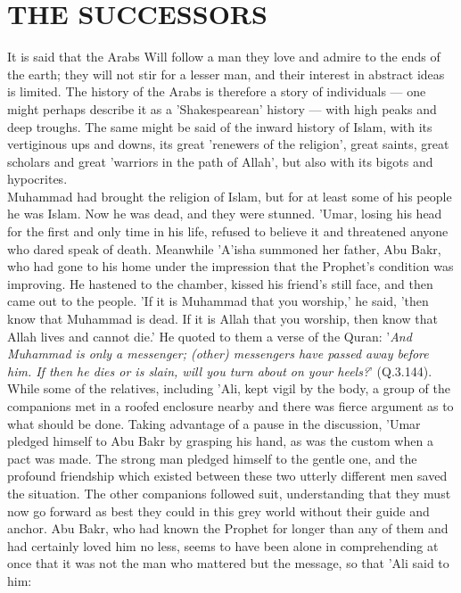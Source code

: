 \documentclass[10pt, twoside,openright]{book}
\begin{document}
\chapter{THE SUCCESSORS}

It is said that the Arabs Will follow a man they love and admire to the ends of the earth; they will not stir for a lesser man, and their interest in abstract ideas is limited. The history of the Arabs is therefore a story of individuals --- one might perhaps describe it as a 'Shakespearean' history --- with high peaks and deep troughs. The same might be said of the inward history of Islam, with its vertiginous ups and downs, its great 'renewers of the religion', great saints, great scholars and great 'warriors in the path of Allah', but also with its bigots and hypocrites. \\

Muhammad had brought the religion of Islam, but for at least some of his people he was Islam. Now he was dead, and they were stunned. 'Umar, losing his head for the first and only time in his life, refused to believe it and threatened anyone who dared speak of death. Meanwhile 'A'isha summoned her father, Abu Bakr, who had gone to his home under the impression that the Prophet's condition was improving. He hastened to the chamber, kissed his friend's still face, and then came out to the people. 'If it is Muhammad that you worship,' he said, 'then know that Muhammad is dead. If it is Allah that you worship, then know that Allah lives and cannot die.' He quoted to them a verse of the Quran: '\emph{And Muhammad is only a messenger; (other) messengers have passed away before him. If then he dies or is slain, will you turn about on your heels?}' (Q.3.144). \\

While some of the relatives, including 'Ali, kept vigil by the body, a group of the companions met in a roofed enclosure nearby and there was fierce argument as to what should be done. Taking advantage of a pause in the discussion, 'Umar pledged himself to Abu Bakr by grasping his hand, as was the custom when a pact was made. The strong man pledged himself to the gentle one, and the profound friendship which existed between these two utterly different men saved the situation. The other companions followed suit, understanding that they must now go forward as best they could in this grey world without their guide and anchor. Abu Bakr, who had known the Prophet for longer than any of them and had certainly loved him no less, seems to have been alone in comprehending at once that it was not the man who mattered but the message, so that 'Ali said to him: \\
\end{document}
